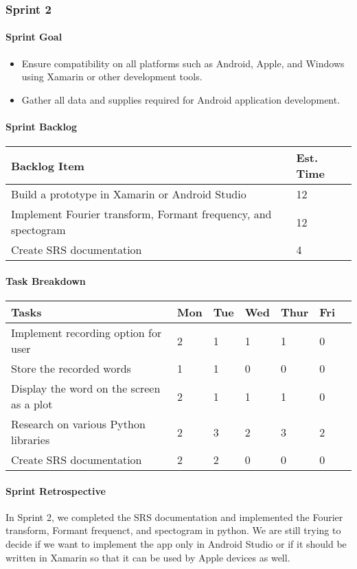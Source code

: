 \subsubsection{Sprint 2}

\paragraph{Sprint Goal}
\begin{itemize}
    \item  Ensure compatibility on all platforms such as Android, Apple, and Windows using Xamarin or other development tools.
    \item  Gather all data and supplies required for Android application development.
\end{itemize}

\paragraph{Sprint Backlog}
\begin{table}[htbp]
    \centering
    \begin{tabularx}{\textwidth}{l|l}
        Backlog Item & Est. Time\\
        \hline
        Build a prototype in Xamarin or Android Studio & 12\\
        Implement Fourier transform, Formant frequency, and spectogram & 12\\
        Create SRS documentation & 4
    \end{tabularx}
\end{table}

\paragraph{Task Breakdown}
\begin{tabular}[htbp]
    \centering
    \begin{tabularx}{\textwidth}{l|l|l|l|l|l|l}
        Tasks &    Mon & Tue & Wed & Thur & Fri\\
        \hline
        Implement recording option for user & 2 & 1 & 1 & 1 & 0\\
        Store the recorded words & 1 & 1 & 0 & 0 & 0\\
        Display the word on the screen as a plot & 2 & 1 & 1 & 1 & 0\\
        Research on various Python libraries & 2 & 3 & 2 & 3 & 2\\
        Create SRS documentation & 2 & 2 & 0 & 0 & 0\\
    \end{tabularx}
\end{tabular}

\paragraph{Sprint Retrospective}
In Sprint 2, we completed the SRS documentation and implemented the Fourier transform, Formant frequenct, and spectogram in python. We are still trying to decide if we want to implement the app only in Android Studio or if it should be written in Xamarin so that it can be used by Apple devices as well.

